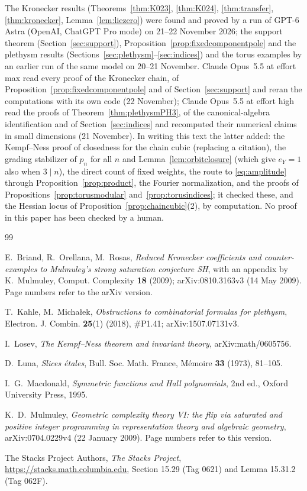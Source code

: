 The Kronecker results (Theorems~\ref{thm:K023}, \ref{thm:K024},
\ref{thm:transfer}, \ref{thm:kronecker}, Lemma~\ref{lem:liezero}) were found
and proved by a run of GPT-6 Astra (OpenAI, ChatGPT Pro mode) on 21--22
November 2026; the support theorem (Section~\ref{sec:support}),
Proposition~\ref{prop:fixedcomponentpole} and the plethysm results
(Sections~\ref{sec:plethysm}--\ref{sec:indices}) and the torus examples by an
earlier run of the same model on 20--21 November. Claude Opus~5.5 at effort max
read every proof of the Kronecker chain, of
Proposition~\ref{prop:fixedcomponentpole} and of Section~\ref{sec:support} and
reran the computations with its own code (22 November); Claude Opus~5.5 at
effort high read the proofs of Theorem~\ref{thm:plethysmPH3}, of the
canonical-algebra identification and of Section~\ref{sec:indices} and recomputed
their numerical claims in small dimensions (21 November). In writing this text
the latter added: the Kempf--Ness proof of closedness for the chain cubic
(replacing a citation), the grading stabilizer of $p_n$ for all $n$ and
Lemma~\ref{lem:orbitclosure} (which give $e_Y=1$ also when $3\mid n$), the
direct count of fixed weights, the route to \eqref{eq:amplitude} through
Proposition~\ref{prop:product}, the Fourier normalization, and the proofs of
Propositions~\ref{prop:torusmodular} and~\ref{prop:torusindices}; it checked
these, and the Hessian locus of Proposition~\ref{prop:chaincubic}(2), by
computation. No proof in this paper has been checked by a human.

\begin{thebibliography}{99}

E.~Briand, R.~Orellana, M.~Rosas, \emph{Reduced Kronecker coefficients and
counter-examples to Mulmuley's strong saturation conjecture SH}, with an
appendix by K.~Mulmuley, Comput. Complexity \textbf{18} (2009);
arXiv:0810.3163v3 (14 May 2009). Page numbers refer to the arXiv version.

T.~Kahle, M.~Micha\l{}ek, \emph{Obstructions to combinatorial formulas for
plethysm}, Electron. J. Combin. \textbf{25}(1) (2018), \#P1.41;
arXiv:1507.07131v3.

I.~Losev, \emph{The Kempf--Ness theorem and invariant theory},
arXiv:math/0605756.

D.~Luna, \emph{Slices \'etales}, Bull. Soc. Math. France, M\'emoire \textbf{33}
(1973), 81--105.

I.~G.~Macdonald, \emph{Symmetric functions and Hall polynomials}, 2nd ed.,
Oxford University Press, 1995.

K.~D.~Mulmuley, \emph{Geometric complexity theory VI: the flip via saturated
and positive integer programming in representation theory and algebraic
geometry}, arXiv:0704.0229v4 (22 January 2009). Page numbers refer to this
version.

The Stacks Project Authors, \emph{The Stacks Project},
\url{https://stacks.math.columbia.edu}, Section 15.29 (Tag 0621) and
Lemma 15.31.2 (Tag 062F).

\end{thebibliography}


